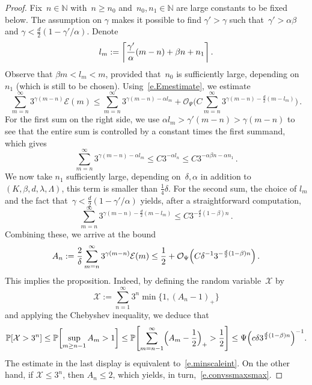 \documentclass[11pt]{article} %
\numberwithin{equation}{section}
\theoremstyle{definition}
\let\originalleft\left
\let\originalright\right
\renewcommand{\left}{\mathopen{}\mathclose\bgroup\originalleft}
\renewcommand{\right}{\aftergroup\egroup\originalright}
\newcommand*{\N}{\ensuremath{\mathbb{N}}}
\renewcommand{\P}{\mathbb{P}}
\newcommand{\X}{\mathcal{X}}
\renewcommand{\O}{\mathcal{O}}
\begin{document}
\begin{proof}
Fix~$n\in\N$ with~$n\geq n_0$ and~$n_0,n_1\in\N$ are large constants to be fixed below. The assumption on $\gamma$ makes it possible to find $\gamma'>\gamma$ such that~$\gamma'>\alpha\beta$ and $\gamma < \frac d2(1 - \gamma'/\alpha)$. 
Denote
\begin{equation*}
l_m := \left\lceil \frac{\gamma'}{\alpha}(m-n) + \beta n +n_1 \right\rceil
\,.
\end{equation*}
Observe that $\beta m < l_m < m$, provided that~$n_0$ is sufficiently large, depending on~$n_1$ (which is still to be chosen). 
Using~\eqref{e.Emestimate}, we estimate
\begin{equation*}
\sum_{m=n}^\infty 3^{\gamma(m-n)} \mathcal{E}(m)
\leq 
\sum_{m=n}^\infty 3^{\gamma(m-n) - \alpha l_m}
+
\O_\Psi 
\biggl( C \sum_{m=n}^\infty 3^{\gamma(m-n) - \frac d2(m-l_m)} 
\biggr)
\,.
\end{equation*}
For the first sum on the right side, we use $\alpha l_m > \gamma' (m-n) > \gamma(m-n)$ to see that the entire sum is controlled by a constant times the first summand, which gives
\begin{equation*}
\sum_{m=n}^\infty 3^{\gamma(m-n) - \alpha l_m}
\leq
C 3^{-\alpha l_n} \leq C 3^{-\alpha \beta n - \alpha n_1}
\,.
\end{equation*}
We now take $n_1$ sufficiently large, depending on~$\delta,\alpha$ in addition to $(K,\beta,d,\lambda,\Lambda)$, this term is smaller than $\frac14 \delta $. For the second sum, the choice of $l_m$ and the fact that~$\gamma < \frac d2(1 - \gamma'/\alpha)$ yields, after a straightforward computation, 
\begin{equation*}
\sum_{m=n}^\infty 3^{\gamma(m-n) - \frac d2(m-l_m)} 
\leq
C 3^{-\frac d2(1-\beta)n}
\,.
\end{equation*}
Combining these, we arrive at the bound
\begin{equation*}
A_n := \frac 2{\delta }  \sum_{m=n}^\infty 3^{\gamma (m-n)} \mathcal{E}(m) 
\leq
\frac12 + 
\O_\Psi\left(C\delta^{-1} 3^{-\frac d2(1-\beta)n} \right) 
\,.
\end{equation*}
This implies the proposition. Indeed, by defining the random variable~$\X$ by
\begin{equation*}
\X
:=  
\sum_{n=1}^{\infty} 3^n \min\big \{ 1 ,  (A_n - 1)_+ \big\}  
\end{equation*}
and applying the Chebyshev inequality, we deduce that
\begin{equation*}
\P\left[ \X > 3^n \right] 
\leq 
\P \left[ \sup_{m\geq n-1} A_m > 1 \right] 
\leq
\P \left[ \sum_{m=n-1}^\infty \Bigl(A_m  - \frac12\Bigr)_+ > \frac12 \right] 
\leq 
\Psi\left( c \delta 3^{\frac d2(1-\beta)n} \right)^{-1}.
\end{equation*}
The estimate in the last display is equivalent to~\eqref{e.minscaleint}. On the other hand, if $\X \leq 3^n$, then $ A_n \leq 2$, which yields, in turn,~\eqref{e.convssmaxsmax}.
\end{proof}
\end{document}
